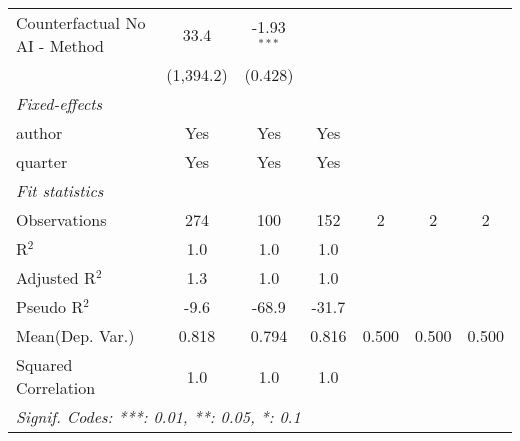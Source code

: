 \begin{tabular}{lcccccc}
   Counterfactual No AI - Method & 33.4           & -1.93$^{***}$ &             &     &     &   \\   
                                 & (1,394.2)      & (0.428)       &             &     &     &   \\   
   \midrule
   \emph{Fixed-effects}\\
   author                        & Yes            & Yes           & Yes         &     &     & \\  
   quarter                       & Yes            & Yes           & Yes         &     &     & \\  
   \midrule
   \emph{Fit statistics}\\
   Observations                  & 274            & 100           & 152         & 2   & 2   & 2\\  
   R$^2$                         & 1.0            & 1.0           & 1.0         &     &     & \\  
   Adjusted R$^2$                & 1.3            & 1.0           & 1.0         &     &     & \\  
   Pseudo R$^2$                  & -9.6           & -68.9         & -31.7       &     &     & \\  
Mean(Dep. Var.) & 0.818 & 0.794 & 0.816 & 0.500 & 0.500 & 0.500 \\
   Squared Correlation           & 1.0            & 1.0           & 1.0         &     &     & \\  
   \midrule \midrule
   \multicolumn{7}{l}{\emph{Signif. Codes: ***: 0.01, **: 0.05, *: 0.1}}\\
\end{tabular}
\par\endgroup
